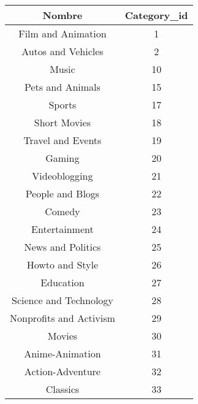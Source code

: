             \begin{center}
                \begin{tabular}{||c | c||}
                    \hline
                    \textbf{Nombre} & \textbf{Category\_id} \\ [0.5ex]
                    \hline\hline
                    Film and Animation & 1 \\
                    \hline
                    Autos and Vehicles & 2 \\
                    \hline
                    Music & 10 \\
                    \hline
                    Pets and Animals & 15 \\
                    \hline
                    Sports & 17 \\
                    \hline
                    Short Movies & 18 \\
                    \hline
                    Travel and Events & 19 \\
                    \hline
                    Gaming & 20 \\
                    \hline
                    Videoblogging & 21 \\
                    \hline
                    People and Blogs & 22 \\
                    \hline
                    Comedy & 23 \\
                    \hline
                    Entertainment & 24 \\
                    \hline
                    News and Politics & 25 \\
                    \hline
                    Howto and Style & 26 \\
                    \hline
                    Education & 27 \\
                    \hline
                    Science and Technology & 28 \\
                    \hline
                    Nonprofits and Activism & 29 \\
                    \hline
                    Movies & 30 \\
                    \hline
                    Anime-Animation & 31 \\
                    \hline
                    Action-Adventure & 32 \\
                    \hline
                    Classics & 33 \\
                    \hline

\end{tabular}
\end{center}
